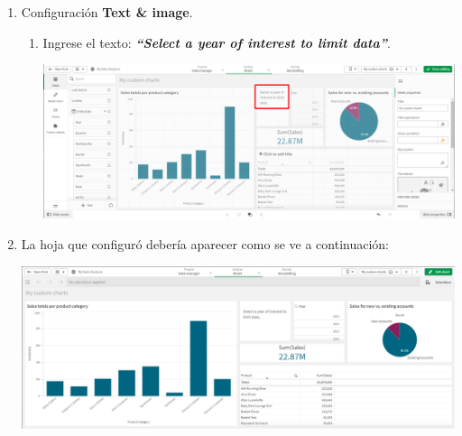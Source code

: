 \documentclass[12pt,letterpaper]{article}
\newcommand\tab[1][1cm]{\hspace*{#1}}
\begin{document}
\begin{enumerate}[\tab 1.]
\begin{enumerate}
\begin{center}
            \end{center}
        \end{enumerate}
        \item Configuración \textbf{Text \& image}.
        \begin{enumerate}
            \item Ingrese el texto: \textit{\textbf{“Select a year of interest to limit data”}}.
            \begin{center}
                \includegraphics[width=13cm]{./img/img35.png}
            \end{center}
        \end{enumerate}
        \item La hoja que configuró debería aparecer como se ve a continuación:
        \begin{center}
            \includegraphics[width=13cm]{./img/img36.png}
        \end{center}
    \end{enumerate}
\end{document}
